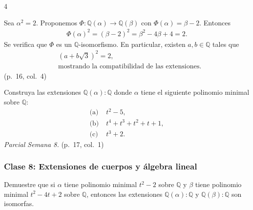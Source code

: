 \documentclass[landscape,a4paper]{article}
\begin{document}
\begin{multicols}{4}
\begin{tcolorbox}[colback=white,colframe=green!50!black,colbacktitle=green!50!black,coltitle=white,title={Ejemplo (p.~16, col.~4)}]
\end{tcolorbox}
Sea $\alpha^{2}=2$.  Proponemos $\Phi:\mathbb{Q}(\alpha)\to\mathbb{Q}(\beta)$ con $\Phi(\alpha)=\beta-2$.  Entonces
\begin{align*}
  \Phi(\alpha)^{2}=(\beta-2)^{2}=\beta^{2}-4\beta+4=2.
\end{align*}
Se verifica que $\Phi$ es un $\mathbb{Q}$-isomorfismo.  En particular, existen $a,b\in\mathbb{Q}$ tales que
\begin{align*}
  &(a+b\sqrt{3})^{2}=2,\quad\\
  &\text{mostrando la compatibilidad de las extensiones.}
\end{align*}
(p.~16, col.~4)

Construya las extensiones $\mathbb{Q}(\alpha):\mathbb{Q}$ donde $\alpha$ tiene el siguiente polinomio minimal sobre $\mathbb{Q}$:
\begin{align*}
  \text{(a)}\;&t^{2}-5,\\
  \text{(b)}\;&t^{4}+t^{3}+t^{2}+t+1,\\
  \text{(c)}\;&t^{3}+2.
\end{align*}
\emph{Parcial Semana 8.} \hfill(p.~17, col.~1)

\subsubsection*{Clase 8: Extensiones de cuerpos y álgebra lineal}
\begin{tcolorbox}[colback=white,colframe=green!50!black,colbacktitle=green!50!black,coltitle=white,title={Ejemplo (p.~18, col.~1)}]
Demuestre que si $\alpha$ tiene polinomio minimal $t^{2}-2$ sobre $\mathbb{Q}$ y $\beta$ tiene polinomio minimal $t^{2}-4t+2$ sobre $\mathbb{Q}$, entonces las extensiones $\mathbb{Q}(\alpha):\mathbb{Q}$ y $\mathbb{Q}(\beta):\mathbb{Q}$ son isomorfas.
\end{tcolorbox}


\end{multicols}
\end{document}
